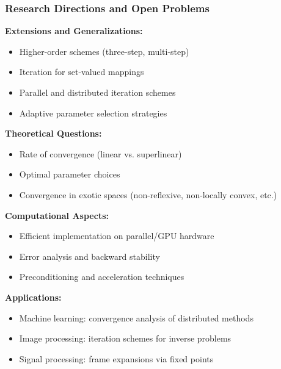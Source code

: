 \documentclass[aspectratio=169,10pt]{beamer}
\begin{document}
\begin{frame}
\frametitle{Research Directions and Open Problems}

\textbf{Extensions and Generalizations:}
\begin{itemize}
    \item Higher-order schemes (three-step, multi-step)
    \item Iteration for set-valued mappings
    \item Parallel and distributed iteration schemes
    \item Adaptive parameter selection strategies
\end{itemize}

\vspace{0.3cm}

\textbf{Theoretical Questions:}
\begin{itemize}
    \item Rate of convergence (linear vs. superlinear)
    \item Optimal parameter choices
    \item Convergence in exotic spaces (non-reflexive, non-locally convex, etc.)
\end{itemize}

\vspace{0.3cm}

\textbf{Computational Aspects:}
\begin{itemize}
    \item Efficient implementation on parallel/GPU hardware
    \item Error analysis and backward stability
    \item Preconditioning and acceleration techniques
\end{itemize}

\vspace{0.3cm}

\textbf{Applications:}
\begin{itemize}
    \item Machine learning: convergence analysis of distributed methods
    \item Image processing: iteration schemes for inverse problems
    \item Signal processing: frame expansions via fixed points
\end{itemize}

\end{frame}
\end{document}
